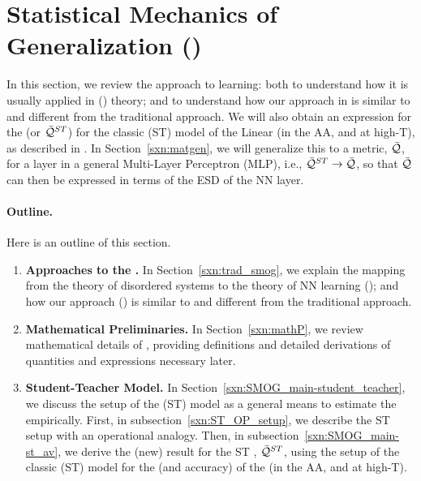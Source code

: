 \section{Statistical Mechanics of Generalization (\SMOG)}
\label{sxn:SMOG_main}

In this section, we review the \STATMECH approach to learning: 
both to understand how it is usually applied in \StatisticalMechanicsOfGeneralization (\SMOG) theory; 
and to understand how our \SemiEmpirical approach in \SETOL is similar to and different from the traditional approach.
We will also obtain an expression for the \GeneralizationAccuracy (or \ModelQuality $\bar{\mathcal{Q}}^{ST}$) for the
classic \StudentTeacher (ST) model of the Linear \Perceptron (in the AA, and at high-T),
as described in \cite{SST90,SST92}.
In Section~\ref{sxn:matgen}, we will generalize this to a \LayerQuality metric, $\bar{\mathcal{Q}}$, for a layer in a general Multi-Layer Perceptron (MLP),
i.e., $\bar{\mathcal{Q}}^{ST}\rightarrow\bar{\mathcal{Q}}$, so that $\bar{\mathcal{Q}}$ can then be expressed in terms of the ESD of the NN layer.

\paragraph{Outline.}
Here is an outline of this section.
\begin{enumerate}[label=4.\arabic*]
\item
  \textbf{Approaches to the \SMOG.}
  In Section~\ref{sxn:trad_smog}, we explain the mapping from the \STATMECH theory of disordered systems
    to the \STATMECH theory of NN learning (\SMOG); and how our \SemiEmpirical approach (\SETOL)
    is similar to and different from the traditional approach.

  \item
      \textbf{Mathematical Preliminaries.}
    In Section~\ref{sxn:mathP}, we review mathematical details of \STATMECH, providing definitions
      and detailed derivations of quantities and expressions necessary later.  

    \item
      \textbf{Student-Teacher Model.}
      In Section~\ref{sxn:SMOG_main-student_teacher}, we discuss the setup of the \StudentTeacher (ST) model
      as a general means to estimate the \AverageGeneralizationError empirically.
      First, in subsection~\ref{sxn:ST_OP_setup}, we describe the ST setup with an operational analogy.
       Then, in subsection~\ref{sxn:SMOG_main-st_av}, we derive the (new) result for the
    ST \ModelQuality, $\bar{\mathcal{Q}}^{ST}$, using the setup of the classic (ST) model for the
    \GeneralizationError (and accuracy) of the \Perceptron (in the AA, and at high-T).
\end{enumerate}

